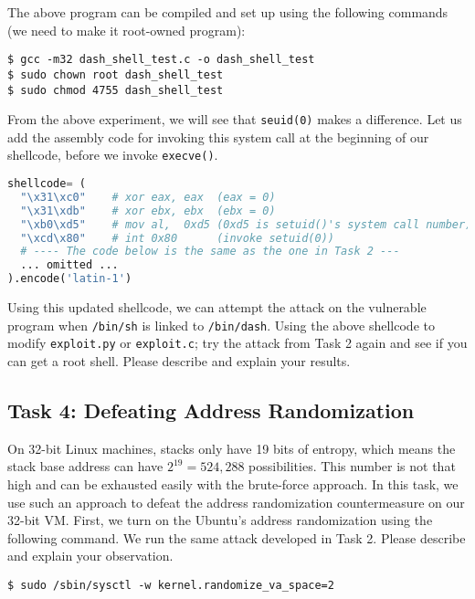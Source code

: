 The above program can be compiled and set up using the following 
commands (we need to make it root-owned \setuid program):

\begin{lstlisting}
$ gcc -m32 dash_shell_test.c -o dash_shell_test
$ sudo chown root dash_shell_test
$ sudo chmod 4755 dash_shell_test
\end{lstlisting}


From the above experiment, we will see that 
\texttt{seuid(0)} makes a difference.  Let us add the assembly 
code for invoking this system call at the beginning of our shellcode, before 
we invoke \texttt{execve()}. 

\begin{lstlisting}[language=python]
shellcode= (
  "\x31\xc0"    # xor eax, eax  (eax = 0)
  "\x31\xdb"    # xor ebx, ebx  (ebx = 0)
  "\xb0\xd5"    # mov al,  0xd5 (0xd5 is setuid()'s system call number)
  "\xcd\x80"    # int 0x80      (invoke setuid(0))
  # ---- The code below is the same as the one in Task 2 ---
  ... omitted ...
).encode('latin-1')
\end{lstlisting}


Using this updated shellcode, we can attempt the attack on the vulnerable
program when \texttt{/bin/sh} is linked to \texttt{/bin/dash}. Using the above shellcode 
to modify \texttt{exploit.py} or \texttt{exploit.c}; try the attack from Task 2 again and see
if you can get a root shell. 
Please describe and explain your results.


\subsection{Task 4: Defeating Address Randomization}

On 32-bit Linux machines, stacks only have 19 bits of entropy, which means the stack base
address can have $2^{19} = 524,288$ possibilities.  This number is not that high and can be
exhausted easily with the brute-force approach. In this task,
we use such an approach to defeat the address randomization countermeasure 
on our 32-bit VM. 
First, we turn on the Ubuntu's address randomization using the 
following command.  We run the same attack
developed in Task 2. Please describe and explain your observation.

\begin{lstlisting}
$ sudo /sbin/sysctl -w kernel.randomize_va_space=2
\end{lstlisting}


